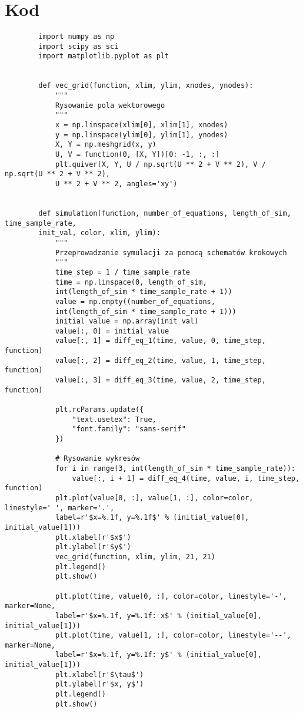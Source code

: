 \documentclass[10pt, a4paper, twoside, onecolumn]{article}
\numberwithin{equation}{section}
\begin{document}
	\section{Kod}
	\begin{verbatim}
		import numpy as np
		import scipy as sci
		import matplotlib.pyplot as plt
		
		
		def vec_grid(function, xlim, ylim, xnodes, ynodes):
			"""
			Rysowanie pola wektorowego
			"""
		    x = np.linspace(xlim[0], xlim[1], xnodes)
		    y = np.linspace(ylim[0], ylim[1], ynodes)
		    X, Y = np.meshgrid(x, y)
		    U, V = function(0, [X, Y])[0: -1, :, :]
		    plt.quiver(X, Y, U / np.sqrt(U ** 2 + V ** 2), V / np.sqrt(U ** 2 + V ** 2), 
		    U ** 2 + V ** 2, angles='xy')
		
		
		def simulation(function, number_of_equations, length_of_sim, time_sample_rate, 
		init_val, color, xlim, ylim):
			"""
			Przeprowadzanie symulacji za pomocą schematów krokowych
			"""
		    time_step = 1 / time_sample_rate
		    time = np.linspace(0, length_of_sim, 
		    int(length_of_sim * time_sample_rate + 1))
		    value = np.empty((number_of_equations, 
		    int(length_of_sim * time_sample_rate + 1)))
		    initial_value = np.array(init_val)
		    value[:, 0] = initial_value
		    value[:, 1] = diff_eq_1(time, value, 0, time_step, function)
		    value[:, 2] = diff_eq_2(time, value, 1, time_step, function)
		    value[:, 3] = diff_eq_3(time, value, 2, time_step, function)
		
		    plt.rcParams.update({
		        "text.usetex": True,
		        "font.family": "sans-serif"
		    })
		
			# Rysowanie wykresów
		    for i in range(3, int(length_of_sim * time_sample_rate)):
		        value[:, i + 1] = diff_eq_4(time, value, i, time_step, function)
		    plt.plot(value[0, :], value[1, :], color=color, linestyle=' ', marker='.', 
		    label=r'$x=%.1f, y=%.1f$' % (initial_value[0], initial_value[1]))
		    plt.xlabel(r'$x$')
		    plt.ylabel(r'$y$')
		    vec_grid(function, xlim, ylim, 21, 21)
		    plt.legend()
		    plt.show()
		
		    plt.plot(time, value[0, :], color=color, linestyle='-', marker=None, 
		    label=r'$x=%.1f, y=%.1f: x$' % (initial_value[0], initial_value[1]))
		    plt.plot(time, value[1, :], color=color, linestyle='--', marker=None, 
		    label=r'$x=%.1f, y=%.1f: y$' % (initial_value[0], initial_value[1]))
		    plt.xlabel(r'$\tau$')
		    plt.ylabel(r'$x, y$')
		    plt.legend()
		    plt.show()
		

\end{verbatim}
\end{document}

